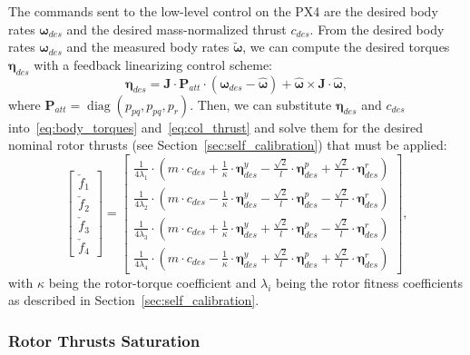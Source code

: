 \documentclass[10pt,a4paper,fleqn]{article}
\newcommand{\bomega}[0]{\boldsymbol{\omega}}
\newcommand{\bVec}[1]{\mathbf{#1}}
\newcommand{\diag}[1]{\operatorname{diag}\left(#1 \right) }
\newcommand{\bodytorque}[0]{\eta}
\newcommand{\bodytorques}[0]{\boldsymbol{\bodytorque}}
\begin{document}
The commands sent to the low-level control on the PX4 are the desired body rates $\bomega_{des}$ and the desired mass-normalized thrust $c_{des}$.
From the desired body rates $\bomega_{des}$ and the measured body rates $\tilde{\bomega}$, we can compute the desired torques $\bodytorques_{des}$ with a feedback linearizing control scheme:
%
\begin{equation}
	\bodytorques_{des}
	= \bVec{J} \cdot \bVec{P}_{att} \cdot \left( \bomega_{des} - \hat{\bomega} \right)
	+ \hat{\bomega} \times \bVec{J} \cdot \hat{\bomega},
\end{equation}
%
where $\bVec{P}_{att}=\diag{p_{pq},p_{pq},p_{r}}$.
Then, we can substitute $\bodytorques_{des}$ and $c_{des}$ into~\eqref{eq:body_torques} and~\eqref{eq:col_thrust} and solve them for the desired nominal rotor thrusts (see Section~\ref{sec:self_calibration}) that must be applied:
%
\begin{equation}
	\begin{bmatrix}
		\check{f}_1 \\ \check{f}_2\\ \check{f}_3 \\ \check{f}_4
	\end{bmatrix}
	= 
	\begin{bmatrix}
		\frac{1}{4 \lambda_1} \cdot \left(m \cdot c_{des} + \frac{1}{\kappa} \cdot \bodytorques_{des}^{y} - \frac{\sqrt{2}}{l} \cdot \bodytorques_{des}^{p} + \frac{\sqrt{2}}{l} \cdot \bodytorques_{des}^{r} \right) \\
 \frac{1}{4 \lambda_2} \cdot \left(m \cdot c_{des} - \frac{1}{\kappa} \cdot \bodytorques_{des}^{y} - \frac{\sqrt{2}}{l} \cdot \bodytorques_{des}^{p} - \frac{\sqrt{2}}{l} \cdot \bodytorques_{des}^{r} \right) \\
  \frac{1}{4 \lambda_3} \cdot \left(m \cdot c_{des} + \frac{1}{\kappa} \cdot \bodytorques_{des}^{y} + \frac{\sqrt{2}}{l} \cdot \bodytorques_{des}^{p} - \frac{\sqrt{2}}{l} \cdot \bodytorques_{des}^{r} \right) \\
  \frac{1}{4 \lambda_4} \cdot \left(m \cdot c_{des} - \frac{1}{\kappa} \cdot \bodytorques_{des}^{y} + \frac{\sqrt{2}}{l} \cdot \bodytorques_{des}^{p} + \frac{\sqrt{2}}{l} \cdot \bodytorques_{des}^{r} \right)
	\end{bmatrix} ,
\end{equation}
%
with $\kappa$ being the rotor-torque coefficient and $\lambda_i$ being the rotor fitness coefficients as described in Section~\ref{sec:self_calibration}.

\subsubsection{Rotor Thrusts Saturation}
\end{document}

